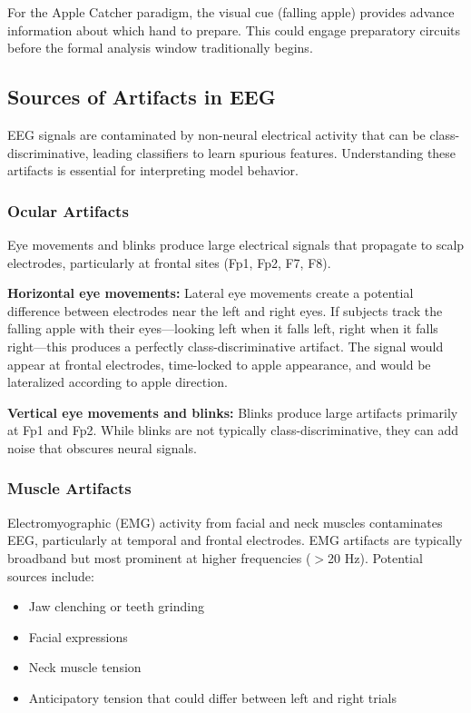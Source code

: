 For the Apple Catcher paradigm, the visual cue (falling apple) provides advance information about which hand to prepare. This could engage preparatory circuits before the formal analysis window traditionally begins.


\subsection{Sources of Artifacts in EEG}
\label{subsec:bg_artifacts}

EEG signals are contaminated by non-neural electrical activity that can be class-discriminative, leading classifiers to learn spurious features. Understanding these artifacts is essential for interpreting model behavior.

\subsubsection{Ocular Artifacts}

Eye movements and blinks produce large electrical signals that propagate to scalp electrodes, particularly at frontal sites (Fp1, Fp2, F7, F8).

\textbf{Horizontal eye movements:} Lateral eye movements create a potential difference between electrodes near the left and right eyes. If subjects track the falling apple with their eyes—looking left when it falls left, right when it falls right—this produces a perfectly class-discriminative artifact. The signal would appear at frontal electrodes, time-locked to apple appearance, and would be lateralized according to apple direction.

\textbf{Vertical eye movements and blinks:} Blinks produce large artifacts primarily at Fp1 and Fp2. While blinks are not typically class-discriminative, they can add noise that obscures neural signals.

\subsubsection{Muscle Artifacts}

Electromyographic (EMG) activity from facial and neck muscles contaminates EEG, particularly at temporal and frontal electrodes. EMG artifacts are typically broadband but most prominent at higher frequencies ($>$20 Hz). Potential sources include:

\begin{itemize}
    \item Jaw clenching or teeth grinding
    \item Facial expressions
    \item Neck muscle tension
    \item Anticipatory tension that could differ between left and right trials
\end{itemize}

